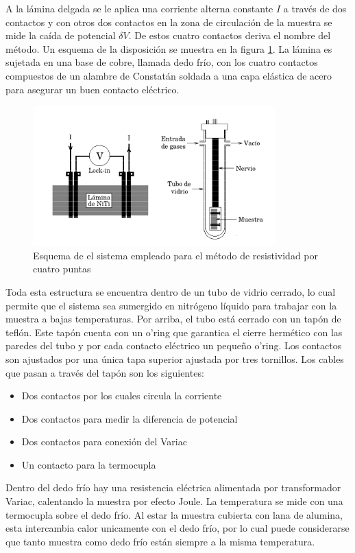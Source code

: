 \documentclass[12pt]{article}
\theoremstyle{definition}
\theoremstyle{remark}
\begin{document}
A la lámina delgada se le aplica una corriente alterna constante $I$ a través de dos contactos y con otros dos contactos en la zona de circulación de la muestra se mide la caída de potencial $\delta V$. De estos cuatro contactos deriva el nombre del método. Un esquema de la disposición se muestra en la figura \ref{4puntas}. La lámina es sujetada en una base de cobre, llamada dedo frío, con los cuatro contactos compuestos de un alambre de Constatán soldada a una capa elástica de acero para asegurar un buen contacto eléctrico.

 \begin{figure}[H]
 	\centering
	\includegraphics[scale=0.5]{img/r4puntas.png}
 	\caption{Esquema de el sistema empleado para el método de resistividad por  cuatro puntas}
	\label{4puntas}
\end{figure} 

Toda esta estructura se encuentra dentro de un tubo de vidrio cerrado, lo cual permite que el sistema sea sumergido en nitrógeno líquido para trabajar con la muestra a bajas temperaturas. Por arriba, el tubo está cerrado con un tapón de teflón. Este tapón cuenta con un o'ring que garantica el cierre hermético con las paredes del tubo y por cada contacto eléctrico un pequeño o'ring. Los contactos son ajustados por una única tapa superior ajustada por tres tornillos. Los cables que pasan a través del tapón son los siguientes:
\begin{itemize}
\item Dos contactos por los cuales circula la corriente 
\item Dos contactos para medir la diferencia de potencial
\item Dos contactos para conexión del Variac
\item Un contacto para la termocupla
\end{itemize}


Dentro del dedo frío hay una resistencia eléctrica alimentada por transformador Variac, calentando la muestra por efecto Joule. La temperatura se mide con una termocupla sobre el dedo frío. Al estar la muestra cubierta con lana de alumina, esta intercambia calor unicamente con el dedo frío, por lo cual puede considerarse que tanto muestra como dedo frío están siempre a la misma temperatura.
\end{document}
